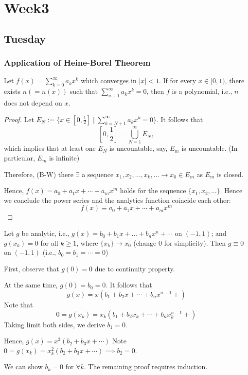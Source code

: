 
\chapter{Week3}

\section{Tuesday}
\subsection{Application of Heine-Borel Theorem}
\begin{theorem}
Let $f(x)=\sum_{k=0}^\infty a_kx^k$ which converges in $|x|<1$. If for every $x\in[0,1)$, there exists $n (=n(x))$ such that $\sum_{n+1}^\infty a_kx^k=0$, then $f$ is a polynomial, i.e., $n$ does not depend on $x$.
\end{theorem}
\begin{proof}
Let $E_N:=\{x\in[0,\frac{1}{2}]\mid \sum_{k=N+1}^\infty a_kx^k=0\}$. It follows that
\[
[0,\frac{1}{2}] = \bigcup_{N=1}^\infty E_N,
\]
which implies that at least one $E_N$ is uncountable, say, $E_m$ is uncountable. (In particular, $E_m$ is infinite)

Therefore, (B-W) there $\exists $ a sequence $x_1,x_2,\dots,x_k,\dots\to x_0\in E_m$ as $E_m$ is closed.

Hence, $f(x)=a_0+a_1x+\cdots+a_mx^m$ holds for the sequence $\{x_1,x_2,\dots\}$. Hence we conclude the power series and the analytics function coincide each other:
\[
f(x)\equiv a_0+a_1x+\cdots+a_mx^m
\]

\end{proof}

\begin{proposition}
Let $g$ be analytic, i.e., $g(x)= b_0+b_1x+\dots+b_nx^n+\cdots$ on $(-1,1)$; and $g(x_k)=0$ for all $k\ge1$, where $\{x_k\}\to x_0$ (change 0 for simplicity). Then $g\equiv0$ on $(-1,1)$ (i.e., $b_0=b_1=\cdots=0$)
\end{proposition}
First, observe that $g(0)=0$ due to continuity property.

At the same time, $g(0)=b_0=0$. It follows that
\[
g(x) = x(b_1+b_2x+\cdots+b_nx^{n-1}+)
\]
Note that
\[
0=g(x_k) = x_k(b_1+b_2x_k+\cdots+b_nx^{n-1}_k+)
\]
Taking limit both sides, we derive $b_1=0$.

Hence, $g(x) = x^2(b_2+b_3x+\cdots)$ Note $0=g(x_k) = x_k^2(b_2+b_3x+\cdots)\implies b_2=0$.

We can show $b_k=0$ for $\forall k$. The remaining proof requires induction.

